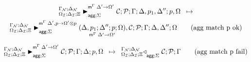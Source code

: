 
\begin{multline}
\transx{
   \matstatea{\deltan}{\lstack{C};
      \lstack{P}}{\Gamma}{\Delta, p_1, \Delta''}{p, \Omega}{\Delta' \rightarrow
         \Omega'}{\Sigma}
}
{
   \matstatea{\deltan}{\lframe{\Delta,
   p_1}{\Delta''}{p}{\Omega}{\Delta'}{\Omega'}, \lstack{C}; \lstack{P}}{\Gamma}{\Delta,
      \Delta''}{\Omega}{\Delta', p \rightarrow \Omega' \otimes
      p}{\Sigma}\tag{agg match p ok}
}
\end{multline}

\[
\trans{
   \matstatea{\deltan}{\lstack{C}; \lstack{P}}{\Gamma}{\Delta}{p,
      \Omega}{\Delta' \rightarrow \Omega'}{\Sigma}
}
{
   \contstatea{\deltan}{\lstack{C} ; \lstack{P}}{\Gamma}{\Sigma}
}\tag{agg match p fail}
\]
